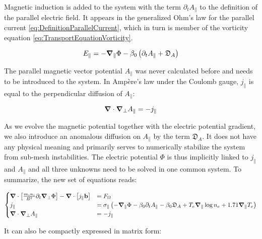 Magnetic induction is added to the system with the term $\partial_t A_\parallel$ to the definition of the parallel electric field. It appears in the generalized Ohm's law for the parallel current \ref{eq:DefinitionParallelCurrent}, which in turn is member of the vorticity equation \ref{eq:TransportEquationVorticity}.

\begin{equation}
	\label{eq:electricField_eq_gradPhi_p_dtA}
	E_\parallel = -\grad_\parallel\Phi - \beta_0\left(\partial_t A_\parallel + \mathfrak{D}_A\right)
\end{equation}

The parallel magnetic vector potential $A_\parallel$ was never calculated before and needs to be introduced to the system. In Ampère's law under the Coulomb gauge, $j_\parallel$ is equal to the perpendicular diffusion of $A_\parallel$: 

\begin{equation}
	\label{eq:S3X_AmpereLaw}
	\grad\cdot\grad_\perp A_\parallel = -j_\parallel
\end{equation}

As we evolve the magnetic potential together with the electric potential gradient, we also introduce an anomalous diffusion on $A_\parallel$ by the term $\mathfrak{D}_A$. It does not have any physical meaning and primarily serves to numerically stabilize the system from sub-mesh instabilities. The electric potential $\Phi$ is thus implicitly linked to $j_\parallel$ and $A_\parallel$ and all three unknowns need to be solved in one common system. To summarize, the new set of equations reads:

\begin{align}
	\label{eq:S3X_vorticityEquation_MagneticInduction}
	\begin{cases}
		\grad\cdot\left[\frac{m_i n_i}{ B^2}\partial_t\grad_\perp\Phi\right] - \grad\cdot\left[j_\parallel\mathbf{b}\right]& = F_\Omega \\
		j_\parallel& = \sigma_\parallel \left(-\grad_\parallel\Phi - \beta_0\partial_t A_\parallel - \beta_0\mathfrak{D}_A + T_e\grad_\parallel\log n_e + 1.71\grad_\parallel T_e \right) \\
		\grad\cdot\grad_\perp A_\parallel& = -j_\parallel
	\end{cases}
\end{align}

It can also be compactly expressed in matrix form: 

